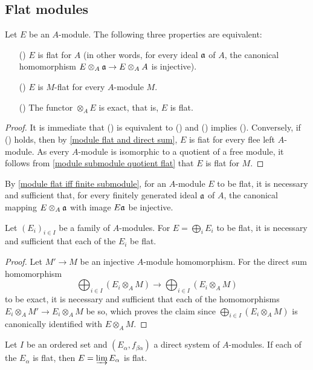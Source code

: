\subsection{Flat modules}
\begin{proposition}\label{module flat iff flat for A}
Let $E$ be an $A$-module. The following three properties are equivalent:
\begin{itemize}
\item[(\rmnum{1})] $E$ is flat for $A$ (in other words, for every ideal $\mathfrak{a}$ of $A$, the canonical homomorphism $E\otimes_A\mathfrak{a}\to E\otimes_AA$ is injective).
\item[(\rmnum{2})] $E$ is $M$-flat for every $A$-module $M$.
\item[(\rmnum{3})] The functor $\otimes_AE$ is exact, that is, $E$ is flat.
\end{itemize}
\end{proposition}
\begin{proof}
It is immediate that () is equivalent to () and () implies (). Conversely, if () holds, then by \cref{module flat and direct sum}, $E$ is fiat for every flee left $A$-module. As every $A$-module is isomorphic to a quotient of a free module, it follows from \cref{module submodule quotient flat} that $E$ is flat for $M$.
\end{proof}
\begin{remark}By \cref{module flat iff finite submodule}, for an $A$-module $E$ to be flat, it is necessary and sufficient that, for every finitely generated ideal $\mathfrak{a}$ of $A$, the canonical mapping $E\otimes_A\mathfrak{a}$ with image $E\mathfrak{a}$ be injective.
\end{remark}
\begin{proposition}\label{module direct sum flat iff}
Let $(E_i)_{i\in I}$ be a family of $A$-modules. For $E=\bigoplus_iE_i$ to be flat, it is necessary and sufficient that each of the $E_i$ be flat.
\end{proposition}
\begin{proof}
Let $M'\to M$ be an injective $A$-module homomorphism. For the direct sum homomorphism
\[\bigoplus_{i\in I}(E_i\otimes_AM)\to\bigoplus_{i\in I}(E_i\otimes_AM)\]
to be exact, it is necessary and sufficient that each of the homomorphisms $E_i\otimes_AM'\to E_i\otimes_AM$ be so, which proves the claim since $\bigoplus_{i\in I}(E_i\otimes_AM)$ is canonically identified with $E\otimes_AM$.
\end{proof}
\begin{proposition}\label{module flat direct limit}
Let $I$ be an ordered set and $(E_\alpha,f_{\beta\alpha})$ a direct system of $A$-modules. If each of the $E_\alpha$ is flat, then $E=\varinjlim E_\alpha$ is flat.
\end{proposition}
